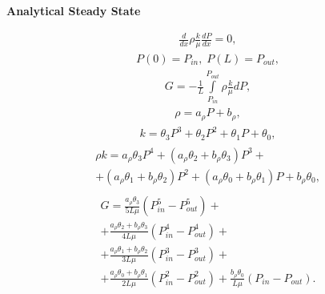\documentclass[a4paper,12pt]{extreport}
\begin{document}
    \begin{multicols}{2}
        \begin{center}
        {\large \textbf{Analytical Steady State}}
        \end{center}

        \begin{eqnarray}
            \label{eq:poisson_diff}
            \frac{d}{dx}\rho\frac{k}{\mu} \frac{dP}{dx} = 0,
        \end{eqnarray}
        \begin{eqnarray}
            \label{eq:poisson_diff_bound}
            P\left(0\right) = P_{in}, \; P\left(L\right) = P_{out},
        \end{eqnarray}
        \begin{eqnarray}
            \label{eq:consumption_poisson_diff_geniral}
            G = - \frac{1}{L} \int \limits_{P_{in}}^{P_{out}} \rho\frac{k}{\mu} dP,
        \end{eqnarray}
        \begin{eqnarray}
            \label{eq:poisson_dencity_particular}
            \rho = a_{\rho}P + b_{\rho},
        \end{eqnarray}
        \begin{eqnarray}
            \label{eq:poisson_permeability_particular}
            k = \theta_{3}P^3 + \theta_{2}P^2 + \theta_{1}P + \theta_{0},
        \end{eqnarray}
        \begin{eqnarray}
            \label{eq:poisson_rho_k_mu__particular}
            \begin{gathered}
                \rho k = a_{\rho}\theta_{3}P^4 + \left( a_{\rho}\theta_{2} + b_{\rho}\theta_{3}\right)P^3 +\\
                + \left(a_{\rho}\theta_{1} + b_{\rho}\theta_{2}\right)P^2 +
                \left(a_{\rho}\theta_{0} + b_{\rho}\theta_{1}\right)P + b_{\rho}\theta_{0},
            \end{gathered}
        \end{eqnarray}
        \begin{eqnarray}
            \label{eq:consumption_poisson_diff_particular}
            \begin{gathered}
                G = \frac{a_{\rho}\theta_{3}}{5L\mu} \left(P_{in}^5 -P_{out}^5 \right) +\\
                +\frac{a_{\rho}\theta_{2} + b_{\rho}\theta_{3}}{4L\mu} \left(P_{in}^4 -P_{out}^4 \right) +\\
                +\frac{a_{\rho}\theta_{1} + b_{\rho}\theta_{2}}{3L\mu} \left(P_{in}^3 -P_{out}^3 \right) +\\
                +\frac{a_{\rho}\theta_{0} + b_{\rho}\theta_{1}}{2L\mu} \left(P_{in}^2 -P_{out}^2 \right) +
                \frac{b_{\rho}\theta_{0}}{L\mu} \left(P_{in} -P_{out} \right).
            \end{gathered}
        \end{eqnarray}


\end{multicols}
\end{document}
